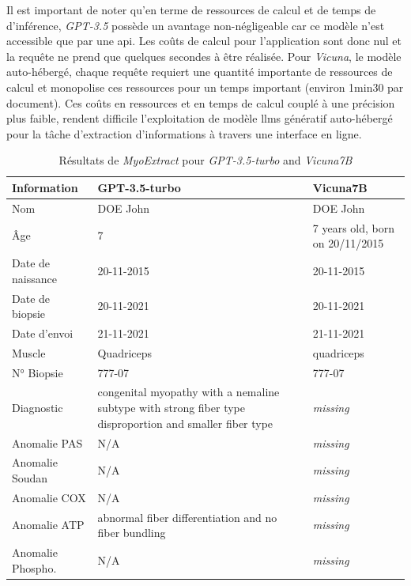 Il est important de noter qu'en terme de ressources de calcul et de temps de d'inférence, \textit{GPT-3.5} possède un avantage non-négligeable car ce modèle n'est accessible que par une \gls{api}. Les coûts de calcul pour l'application sont donc nul et la requête ne prend que quelques secondes à être réalisée. Pour \textit{Vicuna}, le modèle auto-hébergé, chaque requête requiert une quantité importante de ressources de calcul et monopolise ces ressources pour un temps important (environ 1min30 par document). Ces coûts en ressources et en temps de calcul couplé à une précision plus faible, rendent difficile l'exploitation de modèle \gls{llms} génératif auto-hébergé pour la tâche d'extraction d'informations à travers une interface en ligne.
\begin{table}[htbp]
\centering
\caption{Résultats de \textit{MyoExtract} pour \textit{GPT-3.5-turbo} and \textit{Vicuna7B}}
\label{tab:json_data}
\begin{tabularx}{\textwidth}{|l|X|X|}
\hline
\textbf{Information} & \textbf{GPT-3.5-turbo} & \textbf{Vicuna7B} \\ \hline
Nom & DOE John & DOE John \\ \hline
Âge & 7 & 7 years old, born on 20/11/2015 \\ \hline
Date de naissance & 20-11-2015 & 20-11-2015 \\ \hline
Date de biopsie & 20-11-2021 & 20-11-2021 \\ \hline
Date d'envoi & 21-11-2021 & 21-11-2021 \\ \hline
Muscle & Quadriceps & quadriceps \\ \hline
N° Biopsie & 777-07 & 777-07 \\ \hline
Diagnostic & congenital myopathy with a nemaline subtype with strong fiber type disproportion and smaller fiber type & \textit{missing} \\ \hline
Anomalie PAS & N/A & \textit{missing} \\ \hline
Anomalie Soudan & N/A & \textit{missing} \\ \hline
Anomalie COX & N/A & \textit{missing} \\ \hline
Anomalie ATP & abnormal fiber differentiation and no fiber bundling & \textit{missing} \\ \hline
Anomalie Phospho. & N/A & \textit{missing} \\ \hline
\end{tabularx}
\end{table}

